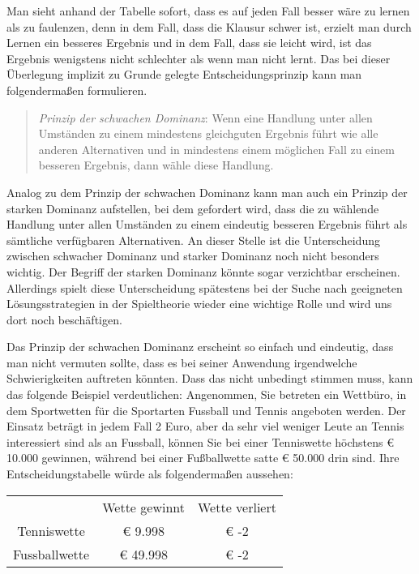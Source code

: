 Man sieht anhand der Tabelle sofort, dass es auf jeden Fall besser wäre zu
lernen als zu faulenzen, denn in dem Fall, dass die Klausur schwer ist,
erzielt man durch Lernen ein besseres Ergebnis und in dem Fall, dass sie leicht
wird, ist das Ergebnis wenigstens nicht schlechter als wenn man nicht lernt.
Das bei dieser Überlegung implizit zu Grunde gelegte Entscheidungsprinzip kann
man folgendermaßen formulieren.

\begin{quotation}
{\em Prinzip der schwachen Dominanz}: Wenn eine Handlung unter
allen Umständen zu einem mindestens gleichguten Ergebnis führt wie alle anderen
Alternativen und in mindestens einem möglichen Fall zu einem besseren Ergebnis,
dann wähle diese Handlung.
\end{quotation}

Analog zu dem Prinzip der schwachen Dominanz kann man auch ein Prinzip der
starken Dominanz aufstellen, bei dem gefordert wird, dass die zu wählende
Handlung unter allen Umständen zu einem eindeutig besseren Ergebnis führt als
sämtliche verfügbaren Alternativen. An dieser Stelle ist die Unterscheidung
zwischen schwacher Dominanz und starker Dominanz noch nicht besonders
wichtig. Der Begriff der starken Dominanz könnte sogar verzichtbar
erscheinen. Allerdings spielt diese Unterscheidung spätestens bei der Suche nach
geeigneten Lösungsstrategien in der Spieltheorie wieder eine wichtige Rolle und
wird uns dort noch beschäftigen.

Das Prinzip der schwachen Dominanz erscheint so einfach und eindeutig, dass man
nicht vermuten sollte, dass es bei seiner Anwendung irgendwelche
Schwierigkeiten auftreten könnten. Dass das nicht unbedingt stimmen muss, kann
das folgende Beispiel verdeutlichen: Angenommen, Sie betreten ein Wettbüro, in
dem Sportwetten für die Sportarten Fussball und Tennis angeboten werden. Der
Einsatz beträgt in jedem Fall 2 Euro, aber da sehr viel weniger Leute an
Tennis interessiert sind als an Fussball, können Sie bei einer Tenniswette
höchstens € 10.000 gewinnen, während bei einer Fußballwette satte 
€ 50.000 drin sind. Ihre Entscheidungstabelle würde als folgendermaßen
aussehen:

\begin{center}
\begin{tabular}{c|c|c|}
\multicolumn{1}{c}{ } & \multicolumn{1}{c}{Wette gewinnt} &
\multicolumn{1}{c}{Wette verliert} \\ \cline{2-3}
Tenniswette   & €  9.998    & € -2         \\ \cline{2-3}
Fussballwette & € 49.998    & € -2         \\ \cline{2-3}
\end{tabular}
\end{center}

